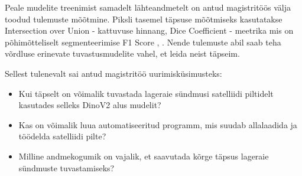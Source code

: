 Peale mudelite treenimist samadelt lähteandmetelt on antud magistritöös välja toodud tulemuste mõõtmine. Piksli tasemel täpsuse mõõtmiseks kasutatakse Intersection over Union - kattuvuse hinnang, Dice Coefficient - meetrika mis on põhimõtteliselt segmenteerimise F1 Score \cite{IntersectionUnionIoU}, \cite{UnderstandingDICECOEFFICIENT}. Nende tulemuste abil saab teha võrdluse erinevate tuvastusmudelite vahel, et leida neist täpseim.

Sellest tulenevalt sai antud magistritöö uurimisküsimusteks:
\begin{itemize}
    \item Kui täpselt on võimalik tuvastada lageraie sündmusi satelliidi piltidelt kasutades selleks DinoV2 alus mudelit?
    \item Kas on võimalik luua automatiseeritud programm, mis suudab allalaadida ja töödelda satelliidi pilte?
    \item Milline andmekogumik on vajalik, et saavutada kõrge täpsus lageraie sündmuste tuvastamiseks?
\end{itemize}